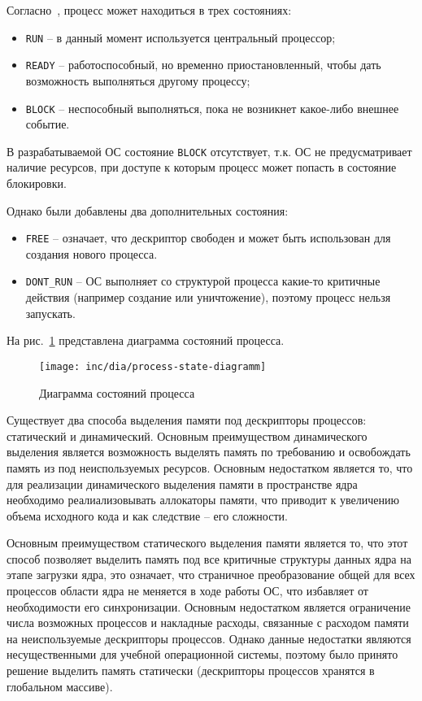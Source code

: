 Согласно~\cite{tanenbaum}, процесс может находиться в трех состояниях:
\begin{itemize}
\item \texttt{RUN} -- в данный момент используется центральный процессор;
\item \texttt{READY} -- работоспособный, но временно приостановленный, чтобы дать
	возможность выполняться другому процессу;
\item \texttt{BLOCK} -- неспособный выполняться, пока не возникнет какое-либо
	внешнее событие.
\end{itemize}

В разрабатываемой ОС состояние \texttt{BLOCK} отсутствует, т.к. ОС не предусматривает
наличие ресурсов, при доступе к которым процесс может попасть в состояние блокировки.

Однако были добавлены два дополнительных состояния:
\begin{itemize}
\item \texttt{FREE} -- означает, что дескриптор свободен и может быть использован
	для создания нового процесса.
\item \texttt{DONT\_RUN} -- ОС выполняет со структурой процесса какие-то критичные действия
	(например создание или уничтожение), поэтому процесс нельзя запускать.
\end{itemize}

На рис.~\ref{fig:process-state-diagramm} представлена диаграмма состояний процесса.

\begin{figure}[ht!]
  \centering
  \texttt{[image: inc/dia/process-state-diagramm]}
  \caption{Диаграмма состояний процесса}
  \label{fig:process-state-diagramm}
\end{figure}

Существует два способа выделения памяти под дескрипторы процессов: статический и динамический.
Основным преимуществом динамического выделения является возможность выделять память по требованию
и освобождать память из под неиспользуемых ресурсов. Основным недостатком является то, что
для реализации динамического выделения памяти в пространстве ядра необходимо реалиализовывать
аллокаторы памяти, что приводит к увеличению объема исходного кода и как следствие -- его сложности.

Основным преимуществом статического выделения памяти является то, что этот способ позволяет
выделить память под все критичные структуры данных ядра на этапе загрузки ядра, это означает,
что страничное преобразование общей для всех процессов области ядра не меняется в ходе работы
ОС, что избавляет от необходимости его синхронизации. Основным недостатком является ограничение
числа возможных процессов и накладные расходы, связанные с расходом памяти на неиспользуемые
дескрипторы процессов. Однако данные недостатки являются несущественными для учебной операционной
системы, поэтому было принято решение выделить память статически (дескрипторы процессов хранятся
в глобальном массиве).

